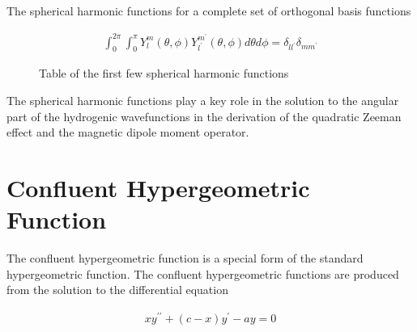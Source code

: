         The spherical harmonic functions for a complete set of orthogonal basis functions 

        \begin{align}
            \int_0^{2\pi} \int_0^\pi Y^m_l(\theta, \phi) Y^{m^\prime}_{l^\prime}(\theta, \phi) d\theta d\phi = \delta_{ll^\prime}\delta_{mm^\prime}
        \end{align}

        \begin{figure}[h]
            \centering 
            \caption{Table of the first few spherical harmonic functions}
            \label{tab:spherical_harmonic}
        \end{figure}

        \noindent The spherical harmonic functions play a key role in the solution to the angular part of the hydrogenic wavefunctions in the derivation of the quadratic Zeeman effect and the magnetic dipole moment operator.

        \section{Confluent Hypergeometric Function} \label{sec:Confluent_Hypergeometric_Function}
        The confluent hypergeometric function is a special form of the standard hypergeometric function. The confluent hypergeometric functions are produced from the solution to the differential equation 

        \begin{align}
            xy^{\prime \prime} + (c - x)y^\prime - ay = 0
        \end{align}

